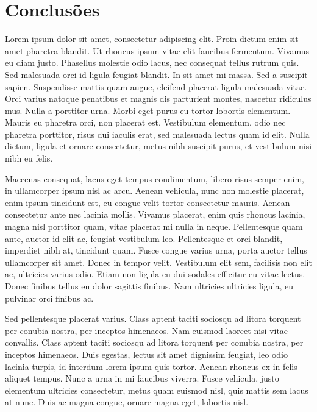 \chapter{Conclusões}

Lorem ipsum dolor sit amet, consectetur adipiscing elit. Proin dictum enim sit amet pharetra blandit. Ut rhoncus ipsum vitae elit faucibus fermentum. Vivamus eu diam justo. Phasellus molestie odio lacus, nec consequat tellus rutrum quis. Sed malesuada orci id ligula feugiat blandit. In sit amet mi massa. Sed a suscipit sapien. Suspendisse mattis quam augue, eleifend placerat ligula malesuada vitae. Orci varius natoque penatibus et magnis dis parturient montes, nascetur ridiculus mus. Nulla a porttitor urna. Morbi eget purus eu tortor lobortis elementum. Mauris eu pharetra orci, non placerat est. Vestibulum elementum, odio nec pharetra porttitor, risus dui iaculis erat, sed malesuada lectus quam id elit. Nulla dictum, ligula et ornare consectetur, metus nibh suscipit purus, et vestibulum nisi nibh eu felis.

Maecenas consequat, lacus eget tempus condimentum, libero risus semper enim, in ullamcorper ipsum nisl ac arcu. Aenean vehicula, nunc non molestie placerat, enim ipsum tincidunt est, eu congue velit tortor consectetur mauris. Aenean consectetur ante nec lacinia mollis. Vivamus placerat, enim quis rhoncus lacinia, magna nisl porttitor quam, vitae placerat mi nulla in neque. Pellentesque quam ante, auctor id elit ac, feugiat vestibulum leo. Pellentesque et orci blandit, imperdiet nibh at, tincidunt quam. Fusce congue varius urna, porta auctor tellus ullamcorper sit amet. Donec in tempor velit. Vestibulum elit sem, facilisis non elit ac, ultricies varius odio. Etiam non ligula eu dui sodales efficitur eu vitae lectus. Donec finibus tellus eu dolor sagittis finibus. Nam ultricies ultricies ligula, eu pulvinar orci finibus ac.

Sed pellentesque placerat varius. Class aptent taciti sociosqu ad litora torquent per conubia nostra, per inceptos himenaeos. Nam euismod laoreet nisi vitae convallis. Class aptent taciti sociosqu ad litora torquent per conubia nostra, per inceptos himenaeos. Duis egestas, lectus sit amet dignissim feugiat, leo odio lacinia turpis, id interdum lorem ipsum quis tortor. Aenean rhoncus ex in felis aliquet tempus. Nunc a urna in mi faucibus viverra. Fusce vehicula, justo elementum ultricies consectetur, metus quam euismod nisl, quis mattis sem lacus at nunc. Duis ac magna congue, ornare magna eget, lobortis nisl.

